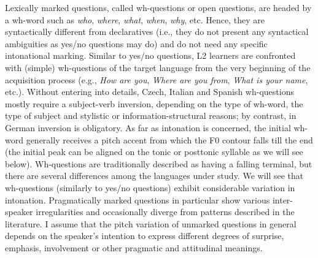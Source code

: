 Lexically marked questions, called wh-questions or open questions, are headed by a wh-word such as \textit{who}, \textit{where}, \textit{what}, \textit{when}, \textit{why}, etc. Hence, they are syntactically different from declaratives (i.e., they do not present any syntactical ambiguities as yes/no questions may do) and do not need any specific intonational marking. Similar to yes/no questions, L2 learners are confronted with (simple) wh-questions of the target language from the very beginning of the acquisition process (e.g., \textit{How are you}, \textit{Where are you from}, \textit{What is your name}, etc.). Without entering into details, Czech, Italian and Spanish wh-questions mostly require a subject-verb inversion, depending on the type of wh-word, the type of subject and stylistic or information-structural reasons; by contrast, in German inversion is obligatory. As far as intonation is concerned, the initial wh-word generally receives a pitch accent from which the F0 contour falls till the end (the initial peak can be aligned on the tonic or posttonic syllable as we will see below). Wh-questions are traditionally described as having a falling terminal, but there are several differences among the languages under study. We will see that wh-questions (similarly to yes/no questions) exhibit considerable variation in intonation. Pragmatically marked questions in particular show various inter-speaker irregularities and occasionally diverge from patterns described in the literature. I assume that the pitch variation of unmarked questions in general depends on the speaker’s intention to express different degrees of surprise, emphasis, involvement or other pragmatic and attitudinal meanings.


